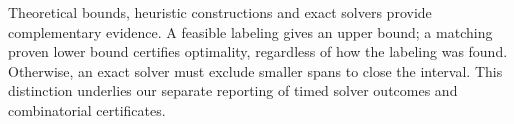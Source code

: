 Theoretical bounds, heuristic constructions and exact solvers provide
complementary evidence. A feasible labeling gives an upper bound; a
matching proven lower bound certifies optimality, regardless of how the
labeling was found. Otherwise, an exact solver must exclude smaller
spans to close the interval. This distinction underlies our separate
reporting of timed solver outcomes and combinatorial certificates.
